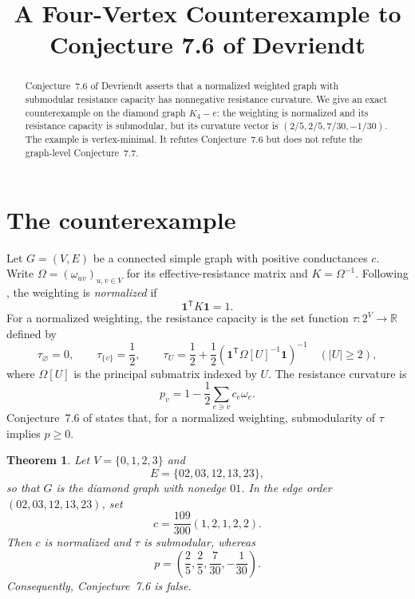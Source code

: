 \documentclass[11pt]{amsart}
\title[A four-vertex counterexample]
{A Four-Vertex Counterexample to Conjecture 7.6 of Devriendt}
\date{}
\newtheorem{theorem}{Theorem}
\newcommand{\one}{\mathbf{1}}
\begin{document}
\begin{abstract}
Conjecture~7.6 of Devriendt asserts that a normalized weighted graph with
submodular resistance capacity has nonnegative resistance curvature. We
give an exact counterexample on the diamond graph $K_4-e$: the weighting is
normalized and its resistance capacity is submodular, but its curvature
vector is $(2/5,2/5,7/30,-1/30)$. The example is vertex-minimal. It refutes
Conjecture~7.6 but does not refute the graph-level Conjecture~7.7.
\end{abstract}

\maketitle

\section{The counterexample}

Let $G=(V,E)$ be a connected simple graph with positive conductances $c$.
Write $\Omega=(\omega_{uv})_{u,v\in V}$ for its effective-resistance matrix
and $K=\Omega^{-1}$. Following \cite{Devriendt}, the weighting is
\emph{normalized} if
\[
\one^{\mathsf T}K\one=1.
\]
For a normalized weighting, the resistance capacity is the set function
$\tau:2^V\to\mathbb R$ defined by
\[
\tau_{\varnothing}=0,
\qquad
\tau_{\{v\}}=\frac12,
\qquad
\tau_U=\frac12+\frac12
\left(\one^{\mathsf T}\Omega[U]^{-1}\one\right)^{-1}
\quad (|U|\ge2),
\]
where $\Omega[U]$ is the principal submatrix indexed by $U$. The resistance
curvature is
\[
p_v=1-\frac12\sum_{e\ni v}c_e\omega_e.
\]
Conjecture~7.6 of \cite{Devriendt} states that, for a normalized weighting,
submodularity of $\tau$ implies $p\ge0$.

\begin{theorem}
Let $V=\{0,1,2,3\}$ and
\[
E=\{02,03,12,13,23\},
\]
so that $G$ is the diamond graph with nonedge $01$. In the edge order
$(02,03,12,13,23)$, set
\[
c=\frac{109}{300}(1,2,1,2,2).
\]
Then $c$ is normalized and $\tau$ is submodular, whereas
\[
p=\left(\frac25,\frac25,\frac7{30},-\frac1{30}\right).
\]
Consequently, Conjecture~7.6 is false.
\end{theorem}
\end{document}
